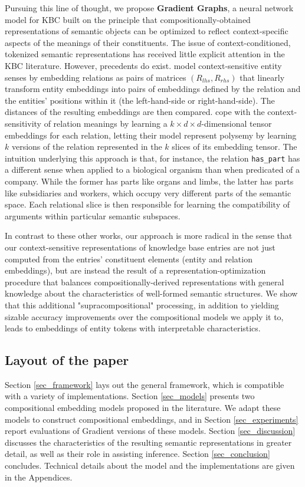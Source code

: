 \documentclass[a4paper,10pt]{article}
\begin{document}
Pursuing this line of thought, we propose \textbf{Gradient Graphs}, a neural network model for KBC built on the principle that compositionally-obtained representations of semantic objects can be optimized to reflect context-specific aspects of the meanings of their constituents. The issue of context-conditioned, tokenized semantic representations has received little explicit attention in the KBC literature. However, precedents do exist. \citet{bordes2011transe} model context-sensitive entity senses by embedding relations as pairs of matrices $(R_{lhs},R_{rhs})$ that linearly transform entity embeddings into pairs of embeddings defined by the relation and the entities' positions within it (the left-hand-side or right-hand-side). The distances of the resulting embeddings are then compared. \citet{socher2013neuraltensor} cope with the context-sensitivity of relation meanings by learning a $k\times d \times d$-dimensional tensor embeddings for each relation, letting their model represent polysemy by learning $k$ versions of the relation represented in the $k$ slices of its embedding tensor. The intuition underlying this approach is that, for instance, the relation \texttt{has\_{}part} has a different sense when applied to a biological organism than when predicated of a company. While the former has parts like organs and limbs, the latter has parts like subsidiaries and workers, which occupy very different parts of the semantic space. Each relational slice is then responsible for learning the compatibility of arguments within particular semantic subspaces.

In contrast to these other works, our approach is more radical in the sense that our context-sensitive representations of knowledge base entries are not just computed from the entries' constituent elements (entity and relation embeddings), but are instead the result of a representation-optimization procedure that balances compositionally-derived representations with general knowledge about the characteristics of well-formed semantic structures. We show that this additional "supracompositional" processing, in addition to yielding sizable accuracy improvements over the compositional models we apply it to, leads to embeddings of entity tokens with interpretable characteristics.

\subsection{Layout of the paper} 

Section \ref{sec_framework} lays out the general framework, which is compatible with a variety of implementations. Section \ref{sec_models} presents two compositional embedding models proposed in the literature. We adapt these models to construct compositional embeddings, and in Section \ref{sec_experiments} report evaluations of Gradient versions of these models. Section \ref{sec_discussion} discusses the characteristics of the resulting semantic representations in greater detail, as well as their role in assisting inference. Section \ref{sec_conclusion} concludes. Technical details about the model and the implementations are given in the Appendices.
\end{document}
